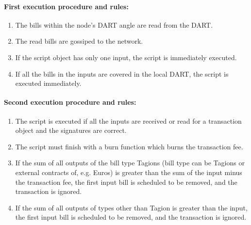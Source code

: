 \paragraph{First execution procedure and rules:}
\begin{enumerate}
 \item 
    The bills within the node's DART angle are read from the DART. 
 \item 
    The read bills are gossiped to the network.
 \item 
    If the script object has only one input, the script is immediately executed.
 \item 
    If all the bills in the inputs are covered in the local DART, the script is executed immediately.
\end{enumerate}

\paragraph{Second execution procedure and rules:}
\begin{enumerate}
\item 
    The script is executed if all the inputs are received or read for a transaction object and the signatures are correct.
\item
    The script must finish with a burn function which burns the transaction fee.
\item 
    If the sum of all outputs of the bill type Tagions (bill type can be Tagions or external contracts of, e.g. Euros) is greater than the sum of the input minus the transaction fee, the first input bill is scheduled to be removed, and the transaction is ignored.
\item 
    If the sum of all outputs of types other than Tagion is greater than the input, the first input bill is scheduled to be removed, and the transaction is ignored.
\end{enumerate}

